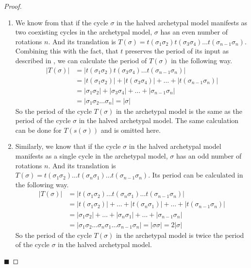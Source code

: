 \begin{proof} \phantom{x}
	\begin{enumerate}
		\item We know from  that if the cycle $\sigma$ in the halved archetypal model manifests as two coexisting cycles in the archetypal model, $\sigma$ has an even number of rotations $n$.
		      And its translation is $T(\sigma) = t(\sigma_1\sigma_2) t(\sigma_3\sigma_4) \dots t(\sigma_{n-1}\sigma_n)$.
		      Combining this with the fact, that $t$ preserves the period of its input as described in , we can calculate the period of $T(\sigma)$ in the following way.
		      \begin{align*}
			      |T(\sigma)| & = |t(\sigma_1\sigma_2) t(\sigma_3\sigma_4) \dots t(\sigma_{n-1}\sigma_n)|           \\
			                  & = |t(\sigma_1\sigma_2)| + |t(\sigma_3\sigma_4)| + \dots + |t(\sigma_{n-1}\sigma_n)| \\
			                  & = |\sigma_1\sigma_2| + |\sigma_3\sigma_4| + \dots + |\sigma_{n-1}\sigma_n|          \\
			                  & = |\sigma_1\sigma_2 \dots \sigma_n| = |\sigma|
		      \end{align*}
		      So the period of the cycle $T(\sigma)$ in the archetypal model is the same as the period of the cycle $\sigma$ in the halved archetypal model.
		      The same calculation can be done for $T(s(\sigma))$ and is omitted here.
		\item Similarly, we know that if the cycle $\sigma$ in the halved archetypal model manifests as a single cycle in the archetypal model, $\sigma$ has an odd number of rotations $n$.
		      And its translation is $T(\sigma) = t(\sigma_1\sigma_2) \dots t(\sigma_n\sigma_1) \dots t(\sigma_{n-1}\sigma_n)$.
		      Its period can be calculated in the following way.
		      \begin{align*}
			      |T(\sigma)| & = |t(\sigma_1\sigma_2) \dots t(\sigma_n\sigma_1) \dots t(\sigma_{n-1}\sigma_n)|                      \\
			                  & = |t(\sigma_1\sigma_2)| + \dots + |t(\sigma_n\sigma_1)| + \dots + |t(\sigma_{n-1}\sigma_n)|          \\
			                  & = |\sigma_1\sigma_2| + \dots + |\sigma_n\sigma_1| + \dots + |\sigma_{n-1}\sigma_n|                   \\
			                  & = |\sigma_1\sigma_2 \dots \sigma_n\sigma_1 \dots \sigma_{n-1}\sigma_n| = |\sigma\sigma| = 2 |\sigma|
		      \end{align*}
		      So the period of the cycle $T(\sigma)$ in the archetypal model is twice the period of the cycle $\sigma$ in the halved archetypal model.
	\end{enumerate}
	\hfill $\blacksquare$
\end{proof}


